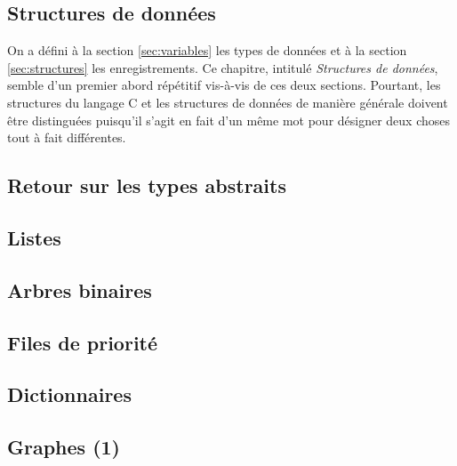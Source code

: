 \documentclass{minitelreport}
\begin{document}
\begin{refsection}
	\chapter{Structures de données}
	\label{cha:structures_de_donn_es_classiques}
	On a défini à la section \ref{sec:variables} les types de données et à la section \ref{sec:structures} les enregistrements. Ce chapitre, intitulé \textit{Structures de données}, semble d'un premier abord répétitif vis-à-vis de ces deux sections. Pourtant, les structures du langage C et les structures de données de manière générale doivent être distinguées puisqu'il s'agit en fait d'un même mot pour désigner deux choses tout à fait différentes.
		\section{Retour sur les types abstraits} %
			\label{sec:type_abstrait_de_donn_es}
			
		\newpage
		\section{Listes}
			\label{sec:listes}
			
		\newpage
		\section{Arbres binaires}
			\label{sec:arbres_binaires}
			
		\newpage
		\section{Files de priorité}
			\label{sec:files_de_priorite}
			
		\newpage
		\section{Dictionnaires}
			\label{sec:dictionnaires}
			
		\newpage
		\section{Graphes (1)}
			\label{sec:graphes}
			
		\newpage

\end{refsection}
\end{document}
